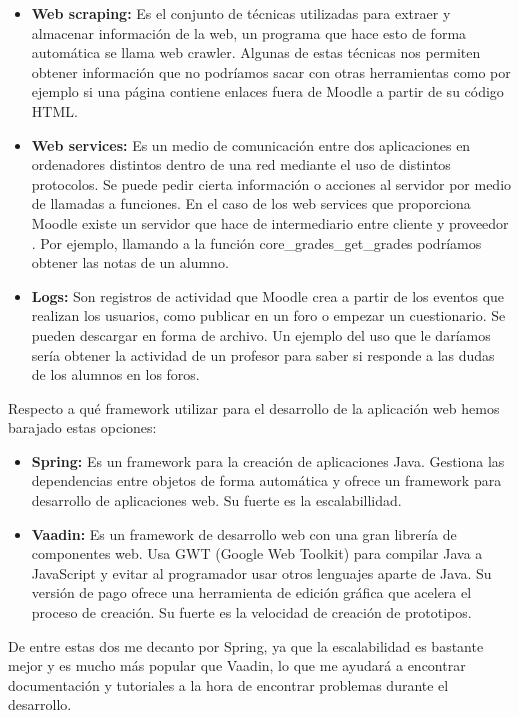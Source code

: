 
\begin{itemize}
	\item \textbf{Web scraping:}
	Es el conjunto de técnicas utilizadas para extraer y almacenar información de la web, un programa que hace esto de forma automática se llama web crawler. Algunas de estas técnicas nos permiten obtener información que no podríamos sacar con otras herramientas como por ejemplo si una página contiene enlaces fuera de Moodle a partir de su código HTML.
	\item \textbf{Web services:}
	Es un medio de comunicación entre dos aplicaciones en ordenadores distintos dentro de una red mediante el uso de distintos protocolos. Se puede pedir cierta información o acciones al servidor por medio de llamadas a funciones. En el caso de los web services que proporciona Moodle existe un servidor que hace de intermediario entre cliente y proveedor \cite{moodle-2020}. Por ejemplo, llamando a la función core\_grades\_get\_grades podríamos obtener las notas de un alumno.
	\item \textbf{Logs:}
	Son registros de actividad que Moodle crea a partir de los eventos que realizan los usuarios, como publicar en un foro o empezar un cuestionario. Se pueden descargar en forma de archivo. Un ejemplo del uso que le daríamos sería obtener la actividad de un profesor para saber si responde a las dudas de los alumnos en los foros.
\end{itemize}

Respecto a qué framework utilizar para el desarrollo de la aplicación web hemos barajado estas opciones:
\begin{itemize}
	\item \textbf{Spring:}
	Es un framework para la creación de aplicaciones Java. Gestiona las dependencias entre objetos de forma automática y ofrece un framework para desarrollo de aplicaciones web. Su fuerte es la escalabillidad.
	\item \textbf{Vaadin:}
	Es un framework de desarrollo web con una gran librería de componentes web. Usa GWT (Google Web Toolkit) para compilar Java a JavaScript y evitar al programador usar otros lenguajes aparte de Java. Su versión de pago ofrece una herramienta de edición gráfica que acelera el proceso de creación. Su fuerte es la velocidad de creación de prototipos.
\end{itemize}

De entre estas dos me decanto por Spring, ya que la escalabilidad es bastante mejor y es mucho más popular que Vaadin, lo que me ayudará a encontrar documentación y tutoriales a la hora de encontrar problemas durante el desarrollo.